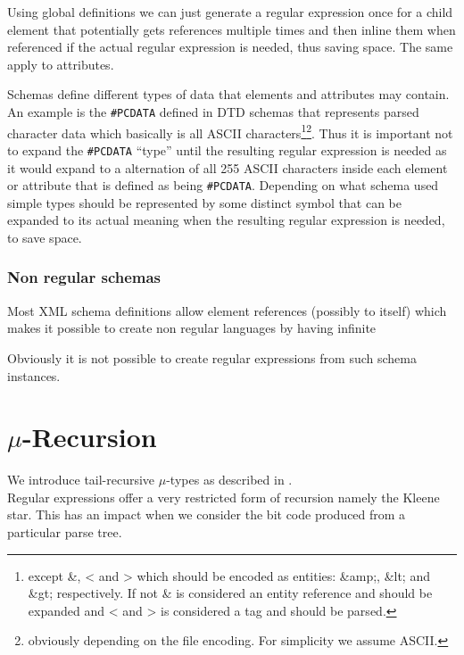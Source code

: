 \documentclass[a4paper, oneside]{memoir}
\theoremstyle{definition}
\begin{document}
Using global definitions we can just generate a regular expression once for a
child element that potentially gets references multiple times and then inline
them when referenced if the actual regular expression is needed, thus saving
space. The same apply to attributes.
\label{sec:global-definitions-save-space}

Schemas define different types of data that elements and attributes may
contain. An example is the \texttt{\#PCDATA} defined in DTD schemas that
represents parsed character data which basically is all ASCII
characters\footnote{except \&, < and > which should be encoded as entities:
  \&amp;, \&lt; and \&gt; respectively. If not \& is considered an entity
  reference and should be expanded and < and > is considered a tag and should be
  parsed.}\footnote{obviously depending on the file encoding. For simplicity we
  assume ASCII.}. Thus it is important not to expand the \texttt{\#PCDATA}
``type'' until the resulting regular expression is needed as it would expand to
a alternation of all 255 ASCII characters inside each element or attribute that
is defined as being \texttt{\#PCDATA}. Depending on what schema used simple
types should be represented by some distinct symbol that can be expanded to its
actual meaning when the resulting regular expression is needed, to save space.

\subsection{ Non regular schemas}

Most XML schema definitions allow element references (possibly to itself) which
makes it possible to create non regular languages by having
infinite


Obviously it is not possible to create regular expressions from such schema
instances.

\chapter{$\mu$-Recursion}
\label{chap:mu-recursion}

We introduce tail-recursive $\mu$-types as described in \cite{heni2010}.\\[1em]

Regular expressions offer a very restricted form of recursion namely the Kleene
star. This has an impact when we consider the bit code produced from a
particular parse tree.
\end{document}
